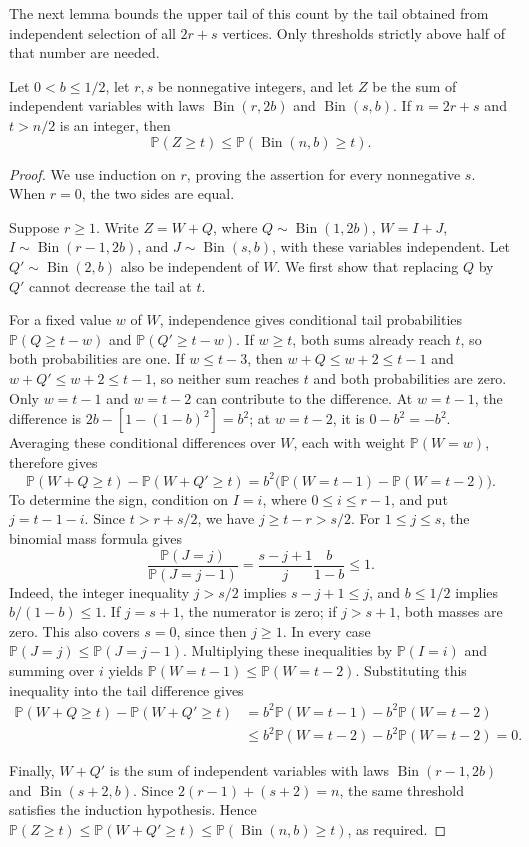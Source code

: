 \documentclass[10pt,a4paper]{article}
\DeclareMathOperator{\Bin}{Bin}
\newcommand{\Pp}{\mathbb P}
\begin{document}
The next lemma bounds the upper tail of this count by the tail obtained from independent selection of all \(2r+s\) vertices. Only thresholds strictly above half of that number are needed.
\begin{lemma}\label{lem:pairtail}
Let \(0<b\le1/2\), let \(r,s\) be nonnegative integers, and let \(Z\) be the sum of independent variables with laws \(\Bin(r,2b)\) and \(\Bin(s,b)\). If \(n=2r+s\) and \(t>n/2\) is an integer, then
\begin{equation}\label{eq:pairtail}
\Pp(Z\ge t)\le\Pp(\Bin(n,b)\ge t).
\end{equation}
\end{lemma}
\begin{proof}
We use induction on \(r\), proving the assertion for every nonnegative \(s\). When \(r=0\), the two sides are equal.

Suppose \(r\ge1\). Write \(Z=W+Q\), where \(Q\sim\Bin(1,2b)\), \(W=I+J\), \(I\sim\Bin(r-1,2b)\), and \(J\sim\Bin(s,b)\), with these variables independent. Let \(Q'\sim\Bin(2,b)\) also be independent of \(W\). We first show that replacing \(Q\) by \(Q'\) cannot decrease the tail at \(t\).

For a fixed value \(w\) of \(W\), independence gives conditional tail probabilities \(\Pp(Q\ge t-w)\) and \(\Pp(Q'\ge t-w)\). If \(w\ge t\), both sums already reach \(t\), so both probabilities are one. If \(w\le t-3\), then \(w+Q\le w+2\le t-1\) and \(w+Q'\le w+2\le t-1\), so neither sum reaches \(t\) and both probabilities are zero. Only \(w=t-1\) and \(w=t-2\) can contribute to the difference. At \(w=t-1\), the difference is \(2b-[1-(1-b)^2]=b^2\); at \(w=t-2\), it is \(0-b^2=-b^2\). Averaging these conditional differences over \(W\), each with weight \(\Pp(W=w)\), therefore gives
\[
\Pp(W+Q\ge t)-\Pp(W+Q'\ge t)
=b^2\bigl(\Pp(W=t-1)-\Pp(W=t-2)\bigr).
\]
To determine the sign, condition on \(I=i\), where \(0\le i\le r-1\), and put \(j=t-1-i\). Since \(t>r+s/2\), we have \(j\ge t-r>s/2\). For \(1\le j\le s\), the binomial mass formula gives
\[
\frac{\Pp(J=j)}{\Pp(J=j-1)}
=\frac{s-j+1}{j}\frac{b}{1-b}\le1.
\]
Indeed, the integer inequality \(j>s/2\) implies \(s-j+1\le j\), and \(b\le1/2\) implies \(b/(1-b)\le1\). If \(j=s+1\), the numerator is zero; if \(j>s+1\), both masses are zero. This also covers \(s=0\), since then \(j\ge1\). In every case \(\Pp(J=j)\le\Pp(J=j-1)\). Multiplying these inequalities by \(\Pp(I=i)\) and summing over \(i\) yields \(\Pp(W=t-1)\le\Pp(W=t-2)\). Substituting this inequality into the tail difference gives
\[
\begin{aligned}
\Pp(W+Q\ge t)-\Pp(W+Q'\ge t)
&=b^2\Pp(W=t-1)-b^2\Pp(W=t-2)\\
&\le b^2\Pp(W=t-2)-b^2\Pp(W=t-2)=0.
\end{aligned}
\]

Finally, \(W+Q'\) is the sum of independent variables with laws \(\Bin(r-1,2b)\) and \(\Bin(s+2,b)\). Since \(2(r-1)+(s+2)=n\), the same threshold satisfies the induction hypothesis. Hence \(\Pp(Z\ge t)\le\Pp(W+Q'\ge t)\le\Pp(\Bin(n,b)\ge t)\), as required.
\end{proof}
\end{document}
